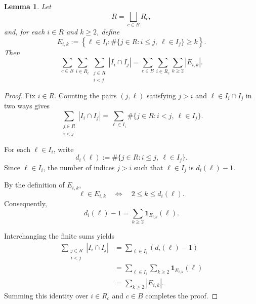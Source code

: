 \documentclass[11pt, letterpaper]{nyjm}
\newtheorem{lemma}[theorem]{Lemma}
\begin{document}
\begin{lemma} \label{lem:decomposition}
	Let
	\[
	R=\bigsqcup_{c\in B}R_c,
	\]
	and, for each \(i\in R\) and \(k\ge2\), define
	\[
	E_{i,k}:=
	\left\{
	\ell\in I_i:
	\#\{j\in R:i\le j,\ \ell\in I_j\}\ge k
	\right\}.
	\]
	Then
	\[
	\sum_{c\in B}\sum_{i\in R_c}
	\sum_{\substack{j\in R\\i<j}}|I_i\cap I_j|
	=
	\sum_{c\in B}\sum_{i\in R_c}
	\sum_{k\ge2}|E_{i,k}|.
	\]
\end{lemma}

\begin{proof}
	Fix \(i\in R\). Counting the pairs
	\((j,\ell)\) satisfying \(j>i\) and
	\(\ell\in I_i\cap I_j\) in two ways gives
	\[
	\sum_{\substack{j\in R\\i<j}}|I_i\cap I_j|
	=
	\sum_{\ell\in I_i}
	\#\{j\in R:i<j,\ \ell\in I_j\}.
	\]
	
	For each \(\ell\in I_i\), write
	\[
	d_i(\ell):=
	\#\{j\in R:i\le j,\ \ell\in I_j\}.
	\]
	Since \(\ell\in I_i\), the number of indices
	\(j>i\) such that \(\ell\in I_j\) is
	\(d_i(\ell)-1\).
	
	By the definition of \(E_{i,k}\),
	\[
	\ell\in E_{i,k}
	\quad\Longleftrightarrow\quad
	2\le k\le d_i(\ell).
	\]
	Consequently,
	\[
	d_i(\ell)-1
	=
	\sum_{k\ge2}\mathbf{1}_{E_{i,k}}(\ell).
	\]
	
	Interchanging the finite sums yields
	\[
	\begin{aligned}
		\sum_{\substack{j\in R\\i<j}}|I_i\cap I_j|
		&=\sum_{\ell\in I_i}(d_i(\ell)-1)\\
		&=\sum_{\ell\in I_i}
		\sum_{k\ge2}\mathbf{1}_{E_{i,k}}(\ell)\\
		&=\sum_{k\ge2}|E_{i,k}|.
	\end{aligned}
	\]
	Summing this identity over \(i\in R_c\)
	and \(c\in B\) completes the proof.
\end{proof}
\end{document}
